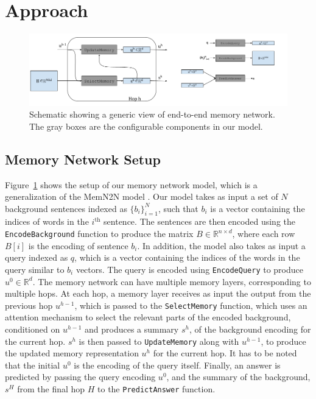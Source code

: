 \section{Approach}
\begin{figure}
\begin{center}
  \includegraphics[width=6in]{figures/memory_network_generic.png}
  \caption{Schematic showing a generic view of end-to-end memory network. The
gray boxes are the configurable components in our model.}
  \label{fig:memnet}
  \end{center}
\end{figure}
\subsection{Memory Network Setup}
Figure~\ref{fig:memnet} shows the setup of our memory network model, which is a
generalization of the MemN2N model \citep{sukhbaatar2015end}. Our model takes as
input a set of $N$ background sentences indexed as $\{b_i\}_{i=1}^N$, such that
$b_i$ is a vector containing the indices of words in the $i^\text{th}$ sentence.
The sentences are then encoded using the \texttt{EncodeBackground} function to
produce the matrix $B \in \mathbb{R}^{n \times d}$, where each row $B[i]$ is the
encoding of sentence $b_i$. In addition, the model also takes as input a query
indexed as $q$, which is a vector containing the indices of the words in the
query similar to $b_i$ vectors. The query is encoded using \texttt{EncodeQuery}
to produce $u^0 \in \mathbb{R}^d$. The memory network can have multiple memory
layers, corresponding to multiple hops. At each hop, a memory layer receives as
input the output from the previous hop $u^{h-1}$, which is passed to the
\texttt{SelectMemory} function, which uses an attention mechanism to select the
relevant parts of the encoded background, conditioned on $u^{h-1}$ and produces
a summary $s^h$, of the background encoding for the current hop. $s^h$ is then
passed to \texttt{UpdateMemory} along with $u^{h-1}$, to produce the updated
memory representation $u^h$ for the current hop. It has to be noted that the
initial $u^0$ is the encoding of the query itself. Finally, an answer is
predicted by passing the query encoding $u^0$, and the summary of the
background, $s^H$ from the final hop $H$ to the \texttt{PredictAnswer} function.

